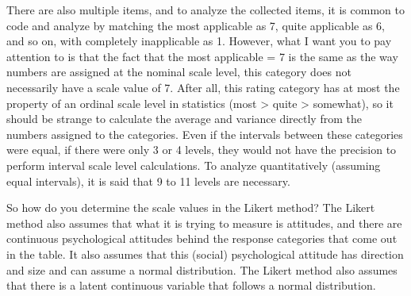 \documentclass{ltjsbook}
\begin{document}
There are also multiple items, and to analyze the collected items, it is common to code and analyze by matching the most applicable as 7, quite applicable as 6, and so on, with completely inapplicable as 1. However, what I want you to pay attention to is that the fact that the most applicable = 7 is the same as the way numbers are assigned at the nominal scale level, this category does not necessarily have a scale value of 7. After all, this rating category has at most the property of an ordinal scale level in statistics (most > quite > somewhat), so it should be strange to calculate the average and variance directly from the numbers assigned to the categories. Even if the intervals between these categories were equal, if there were only 3 or 4 levels, they would not have the precision to perform interval scale level calculations. To analyze quantitatively (assuming equal intervals), it is said that 9 to 11 levels are necessary.

So how do you determine the scale values in the Likert method? The Likert method also assumes that what it is trying to measure is attitudes, and there are continuous psychological attitudes behind the response categories that come out in the table. It also assumes that this (social) psychological attitude has direction and size and can assume a normal distribution. The Likert method also assumes that there is a latent continuous variable that follows a normal distribution.
\end{document}
